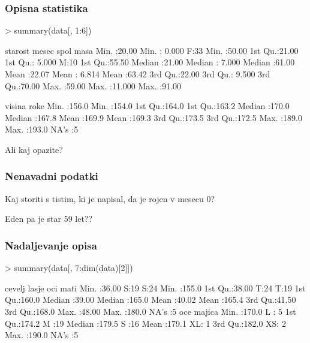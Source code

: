 \begin{frame}[fragile]
\frametitle{Opisna statistika}
\begin{Schunk}
\begin{Sinput}
> summary(data[, 1:6])
\end{Sinput}
\begin{Soutput}
    starost          mesec        spol        masa      
 Min.   :20.00   Min.   : 0.000   F:33   Min.   :50.00  
 1st Qu.:21.00   1st Qu.: 5.000   M:10   1st Qu.:55.50  
 Median :21.00   Median : 7.000          Median :61.00  
 Mean   :22.07   Mean   : 6.814          Mean   :63.42  
 3rd Qu.:22.00   3rd Qu.: 9.500          3rd Qu.:70.00  
 Max.   :59.00   Max.   :11.000          Max.   :91.00  
                                                        
     visina           roke      
 Min.   :156.0   Min.   :154.0  
 1st Qu.:164.0   1st Qu.:163.2  
 Median :170.0   Median :167.8  
 Mean   :169.9   Mean   :169.3  
 3rd Qu.:173.5   3rd Qu.:172.5  
 Max.   :189.0   Max.   :193.0  
                 NA's   :5      
\end{Soutput}
\end{Schunk}
Ali kaj opazite?
\end{frame}
\begin{frame}[fragile]
\frametitle{Nenavadni podatki}
Kaj storiti s tistim, ki je napisal, da je rojen v mesecu 0?

Eden pa je star 59 let??
\end{frame}


\begin{frame}[fragile]
\frametitle{Nadaljevanje opisa}
\begin{Schunk}
\begin{Sinput}
> summary(data[, 7:dim(data)[2]])
\end{Sinput}
\begin{Soutput}
     cevelj      lasje  oci         mati      
 Min.   :36.00   S:19   S:24   Min.   :155.0  
 1st Qu.:38.00   T:24   T:19   1st Qu.:160.0  
 Median :39.00                 Median :165.0  
 Mean   :40.02                 Mean   :165.4  
 3rd Qu.:41.50                 3rd Qu.:168.0  
 Max.   :48.00                 Max.   :180.0  
                               NA's   :5      
      oce        majica 
 Min.   :170.0   L : 5  
 1st Qu.:174.2   M :19  
 Median :179.5   S :16  
 Mean   :179.1   XL: 1  
 3rd Qu.:182.0   XS: 2  
 Max.   :190.0          
 NA's   :5              
\end{Soutput}
\end{Schunk}
\end{frame}
\clearpage
